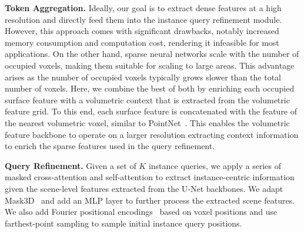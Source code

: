 \documentclass[letterpaper, 10 pt, conference]{ieeeconf}  %
\begin{document}
\noindent\textbf{Token Aggregation.}
Ideally, our goal is to extract dense features at a high resolution and directly feed them into the instance query refinement module. However, this approach comes with significant drawbacks, notably increased memory consumption and computation cost, rendering it infeasible for most applications. On the other hand, sparse neural networks scale with the number of occupied voxels, making them suitable for scaling to large areas. This advantage arises as the number of occupied voxels typically grows slower than the total number of voxels. Here, we combine the best of both by enriching each occupied surface feature with a volumetric context that is extracted from the volumetric feature grid. To this end, each surface feature is concatenated with the feature of the nearest volumetric voxel, similar to PointNet~\cite{qi2017pointnet}. This enables the volumetric feature backbone to operate on a larger resolution extracting context information to enrich the sparse features used in the query refinement.


\noindent\textbf{Query Refinement.}
Given a set of $K$ instance queries, we apply a series of masked cross-attention and self-attention to extract instance-centric information given the scene-level features extracted from the U-Net backbones.
We adapt Mask3D~\cite{schult2022mask3d} and add an MLP layer to further process the extracted scene features.
We also add Fourier positional encodings~\cite{tancik2020fourier} based on voxel positions and use farthest-point sampling to sample initial instance query positions. 
\end{document}
